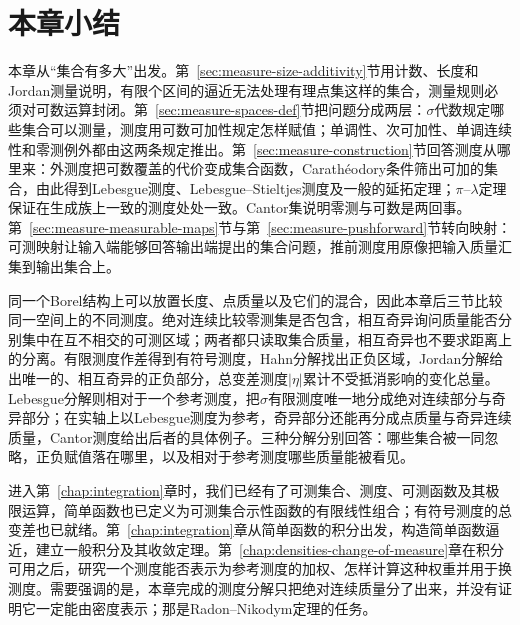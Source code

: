 \section{本章小结}
\label{sec:measure-summary}

本章从“集合有多大”出发。第~\ref{sec:measure-size-additivity}节用计数、长度和Jordan测量说明，有限个区间的逼近无法处理有理点集这样的集合，测量规则必须对可数运算封闭。第~\ref{sec:measure-spaces-def}节把问题分成两层：$\sigma$代数规定哪些集合可以测量，测度用可数可加性规定怎样赋值；单调性、次可加性、单调连续性和零测例外都由这两条规定推出。第~\ref{sec:measure-construction}节回答测度从哪里来：外测度把可数覆盖的代价变成集合函数，Carathéodory条件筛出可加的集合，由此得到Lebesgue测度、Lebesgue–Stieltjes测度及一般的延拓定理；$\pi$–$\lambda$定理保证在生成族上一致的测度处处一致。Cantor集说明零测与可数是两回事。第~\ref{sec:measure-measurable-maps}节与第~\ref{sec:measure-pushforward}节转向映射：可测映射让输入端能够回答输出端提出的集合问题，推前测度用原像把输入质量汇集到输出集合上。

同一个Borel结构上可以放置长度、点质量以及它们的混合，因此本章后三节比较同一空间上的不同测度。绝对连续比较零测集是否包含，相互奇异询问质量能否分别集中在互不相交的可测区域；两者都只读取集合质量，相互奇异也不要求距离上的分离。有限测度作差得到有符号测度，Hahn分解找出正负区域，Jordan分解给出唯一的、相互奇异的正负部分，总变差测度$|\eta|$累计不受抵消影响的变化总量。Lebesgue分解则相对于一个参考测度，把$\sigma$有限测度唯一地分成绝对连续部分与奇异部分；在实轴上以Lebesgue测度为参考，奇异部分还能再分成点质量与奇异连续质量，Cantor测度给出后者的具体例子。三种分解分别回答：哪些集合被一同忽略，正负赋值落在哪里，以及相对于参考测度哪些质量能被看见。

进入第~\ref{chap:integration}章时，我们已经有了可测集合、测度、可测函数及其极限运算，简单函数也已定义为可测集合示性函数的有限线性组合；有符号测度的总变差也已就绪。第~\ref{chap:integration}章从简单函数的积分出发，构造简单函数逼近，建立一般积分及其收敛定理。第~\ref{chap:densities-change-of-measure}章在积分可用之后，研究一个测度能否表示为参考测度的加权、怎样计算这种权重并用于换测度。需要强调的是，本章完成的测度分解只把绝对连续质量分了出来，并没有证明它一定能由密度表示；那是Radon–Nikodym定理的任务。
